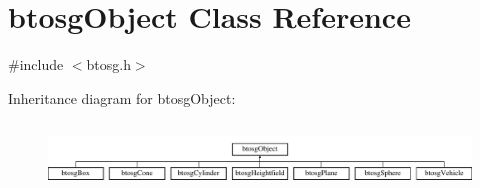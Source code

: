 \hypertarget{classbtosgObject}{}\section{btosg\+Object Class Reference}
\label{classbtosgObject}


{\ttfamily \#include $<$btosg.\+h$>$}

Inheritance diagram for btosg\+Object\+:\begin{figure}[H]
\begin{center}
\leavevmode
\includegraphics[height=1.904762cm]{classbtosgObject}
\end{center}
\end{figure}
